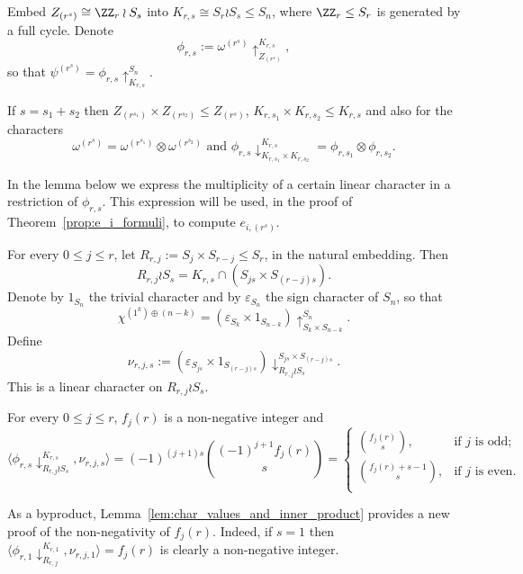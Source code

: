 Embed $Z_{(r^s)} \cong \ZZ_r \wr S_s$ into 
$K_{r,s} \cong S_r \wr S_s \le S_n$, 
where $\ZZ_r \le S_r$ is generated by a full cycle.
Denote 
\[
    \phi_{r,s} := \omega^{(r^s)}\uparrow_{Z_{(r^s)}}^{K_{r,s}},
\]
so that $\psi^{(r^s)} = \phi_{r,s}\uparrow_{K_{r,s}}^{S_n}$. 
\begin{observation}\label{obs:phi_product} 
    If $s=s_1+s_2$ then $Z_{(r^{s_1})}\times Z_{(r^{s_2})}\leq Z_{(r^s)}$, $K_{r,s_1}\times K_{r,s_2}\leq K_{r,s}$ and also for the characters
    \[ 
        \omega^{(r^s)}
        = \omega^{(r^{s_1})}\otimes\omega^{(r^{s_2})}\text{ and }  \phi_{r,s}\downarrow^{K_{r,s}}_{K_{r,s_1}\times K_{r,s_2}}=\phi_{r,s_1}\otimes\phi_{r,s_2}.
    \]
\end{observation}

In the lemma below we express the multiplicity of a certain linear character in a restriction of $\phi_{r,s}$.
This expression will be used, in the proof of Theorem~\ref{prop:e_i_formuli}, to compute $e_{i,(r^s)}$.
	
For every $0\leq j\leq r$, let 
$R_{r,j} := S_j \times S_{r-j} \le S_r$, in the natural embedding. Then
\[
    R_{r,j} \wr S_s
    = K_{r,s} \cap \left( S_{js} \times S_{(r-j)s} \right).
\]
Denote by $1_{S_n}$ the trivial character and by $\varepsilon_{S_n}$ the sign character of $S_n$, so that
\[
    \chi^{(1^k)\oplus(n-k)}=(\varepsilon_{S_{k}}\times 1_{S_{n-k}})\uparrow_{S_k \times S_{n-k}}^{S_n}.
\]
Define
\[
    \nu_{r,j,s} := (\varepsilon_{S_{js}} \times 1_{S_{(r-j)s}}) \downarrow_{R_{r,j}\wr S_s}^{S_{js} \times S_{(r-j)s}}.
\]
This is a linear character on $R_{r,j} \wr S_s$.
	
\begin{lemma}\label{lem:char_values_and_inner_product}
    For every $0\le j\le r$,
    $f_j(r)$ is a non-negative integer and 
    \[
        \langle \phi_{r,s}\downarrow_{R_{r,j}\wr S_{s}}^{K_{r,s}},\nu_{r,j,s} \rangle 
        = (-1)^{(j+1)s} \binom{(-1)^{j+1} f_j(r)}{s}
        = \begin{cases}
            \binom{f_j(r)}{s}, &\text{if } j \text{ is odd;}\\
            \binom{f_j(r)+s-1}{s}, &\text{if } j \text{ is even.}\\
        \end{cases}
    \]
\end{lemma}
		
\begin{remark}
    As a byproduct, Lemma~\ref{lem:char_values_and_inner_product}
    provides a new proof of the non-negativity of $f_j(r)$.
    Indeed, if $s=1$ then 
    $\langle \phi_{r,1} \downarrow_{R_{r,j}}^{K_{r,1}},\nu_{r,j,1} \rangle = f_j(r)$ 
    is clearly a non-negative integer.
\end{remark}	
	
